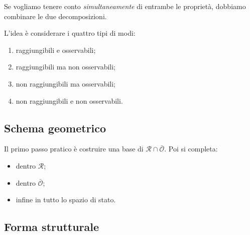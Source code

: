 Se vogliamo tenere conto \emph{simultaneamente} di entrambe le proprietà, dobbiamo combinare le due decomposizioni.

\medskip

L'idea è considerare i quattro tipi di modi:
\begin{enumerate}
    \item raggiungibili e osservabili;
    \item raggiungibili ma non osservabili;
    \item non raggiungibili ma osservabili;
    \item non raggiungibili e non osservabili.
\end{enumerate}

\subsection{Schema geometrico}

\begin{center}
\end{center}

\medskip

Il primo passo pratico è costruire una base di \(\mathcal R\cap\bar{\mathcal O}\).  
Poi si completa:
\begin{itemize}
    \item dentro \(\mathcal R\);
    \item dentro \(\bar{\mathcal O}\);
    \item infine in tutto lo spazio di stato.
\end{itemize}

\subsection{Forma strutturale}

